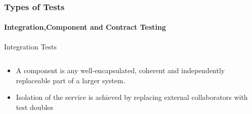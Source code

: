\documentclass{beamer}
\begin{document}
\begin{frame}
	\frametitle{Types of Tests}	
	\framesubtitle{Integration,Component and Contract Testing }
Integration Tests
\begin{columns}
 \begin{column}{.49\textwidth}
	\begin{itemize}
		\item A component is any well-encapsulated, coherent and independently replaceable part of a larger system.
		\item Isolation of the service is achieved by replacing external collaborators with test doubles
		
	\end{itemize}
\end{column}
\end{columns}
\end{frame}
\end{document}
